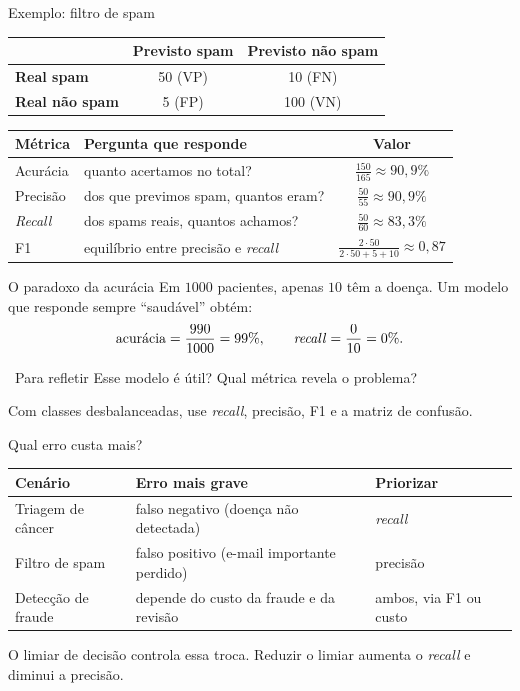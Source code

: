 \documentclass[10pt]{beamer}
\newenvironment{reflexao}{\begin{exampleblock}{\faQuestionCircle\ Para refletir}}{\end{exampleblock}}
\begin{document}
\begin{frame}{Exemplo: filtro de spam}
\centering
\begin{tabular}{@{}lcc@{}}
\toprule
 & \textbf{Previsto spam} & \textbf{Previsto não spam} \\
\midrule
\textbf{Real spam} & 50 (VP) & 10 (FN) \\
\textbf{Real não spam} & 5 (FP) & 100 (VN) \\
\bottomrule
\end{tabular}

\vspace{3mm}
\begin{tabularx}{\textwidth}{@{}l X c@{}}
\toprule
\textbf{Métrica} & \textbf{Pergunta que responde} & \textbf{Valor} \\
\midrule
Acurácia & quanto acertamos no total? & $\frac{150}{165}\approx 90{,}9\%$ \\
Precisão & dos que previmos spam, quantos eram? & $\frac{50}{55}\approx 90{,}9\%$ \\
\textit{Recall} & dos spams reais, quantos achamos? & $\frac{50}{60}\approx 83{,}3\%$ \\
F1 & equilíbrio entre precisão e \textit{recall} & $\frac{2\cdot50}{2\cdot50+5+10}\approx 0{,}87$ \\
\bottomrule
\end{tabularx}
\end{frame}

\begin{frame}{O paradoxo da acurácia}
Em $1000$ pacientes, apenas $10$ têm a doença. Um modelo que responde sempre ``saudável'' obtém:
\[ \text{acurácia}=\frac{990}{1000}=99\%, \qquad \text{\textit{recall}}=\frac{0}{10}=0\%. \]
\begin{reflexao}
Esse modelo é útil? Qual métrica revela o problema?
\end{reflexao}
\small Com classes desbalanceadas, use \textit{recall}, precisão, F1 e a matriz de confusão.
\end{frame}

\begin{frame}{Qual erro custa mais?}
\small
\begin{tabularx}{\textwidth}{@{}l X X@{}}
\toprule
\textbf{Cenário} & \textbf{Erro mais grave} & \textbf{Priorizar} \\
\midrule
Triagem de câncer & falso negativo (doença não detectada) & \textit{recall} \\
Filtro de spam & falso positivo (e-mail importante perdido) & precisão \\
Detecção de fraude & depende do custo da fraude e da revisão & ambos, via F1 ou custo \\
\bottomrule
\end{tabularx}

\vspace{2mm}
O limiar de decisão controla essa troca. Reduzir o limiar aumenta o \textit{recall} e diminui a precisão.
\end{frame}
\end{document}
